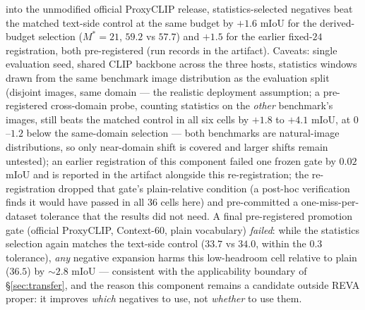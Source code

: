 \documentclass[11pt]{article}
\newcommand{\miou}{mIoU}
\newcommand{\reva}{REVA}
\begin{document}
into the unmodified official ProxyCLIP release, statistics-selected
negatives beat the matched text-side control at the same budget by
$+1.6$ \miou{} for the derived-budget selection ($M^\ast{=}21$,
$59.2$ vs $57.7$) and $+1.5$ for the earlier fixed-$24$ registration,
both pre-registered (run records in the artifact). Caveats: single evaluation seed,
shared CLIP backbone across the three hosts, statistics windows drawn
from the same benchmark image distribution as the evaluation split
(disjoint images, same domain --- the realistic deployment assumption;
a pre-registered cross-domain probe, counting statistics on the
\emph{other} benchmark's images, still beats the matched control in all
six cells by $+1.8$ to $+4.1$ \miou{}, at $0$--$1.2$ below the
same-domain selection --- both benchmarks are natural-image
distributions, so only near-domain shift is covered and larger shifts
remain untested); an earlier registration of
this component failed one frozen gate by $0.02$ \miou{} and is reported
in the artifact alongside this re-registration; the re-registration
dropped that gate's plain-relative condition (a post-hoc verification
finds it would have passed in all $36$ cells here) and pre-committed a
one-miss-per-dataset tolerance that the results did not need. A final
pre-registered promotion gate (official ProxyCLIP, Context-60, plain
vocabulary) \emph{failed}: while the statistics selection again matches
the text-side control ($33.7$ vs $34.0$, within the $0.3$ tolerance),
\emph{any} negative expansion harms this low-headroom cell relative to
plain ($36.5$) by ${\sim}2.8$ \miou{} --- consistent with the
applicability boundary of \S\ref{sec:transfer}, and the reason this
component remains a candidate outside \reva{} proper: it improves
\emph{which} negatives to use, not \emph{whether} to use them.
\end{document}
